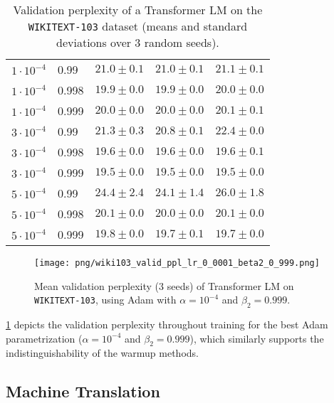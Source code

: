 {\begin{table}[ht]
\begin{tabular}{l l | c c c}
  \midrule
  
$1 \cdot {10}^{-4}$ & 0.99& $ 21.0 \pm  0.1 $& $ 21.0 \pm  0.1 $& $ 21.1 \pm  0.1 $\\
$1 \cdot {10}^{-4}$ & 0.998& $ 19.9 \pm  0.0 $& $ 19.9 \pm  0.0 $& $ 20.0 \pm  0.0 $\\
$1 \cdot {10}^{-4}$ & 0.999& $ 20.0 \pm  0.0 $& $ 20.0 \pm  0.0 $& $ 20.1 \pm  0.1 $\\
$3 \cdot {10}^{-4}$ & 0.99& $ 21.3 \pm  0.3 $& $ 20.8 \pm  0.1 $& $ 22.4 \pm  0.0 $\\
$3 \cdot {10}^{-4}$ & 0.998& $ 19.6 \pm  0.0 $& $ 19.6 \pm  0.0 $& $ 19.6 \pm  0.1 $\\
$3 \cdot {10}^{-4}$ & 0.999& $ 19.5 \pm  0.0 $& $ 19.5 \pm  0.0 $& $ 19.5 \pm  0.0 $\\
$5 \cdot {10}^{-4}$ & 0.99& $ 24.4 \pm  2.4 $& $ 24.1 \pm  1.4 $& $ 26.0 \pm  1.8 $\\
$5 \cdot {10}^{-4}$ & 0.998& $ 20.1 \pm  0.0 $& $ 20.0 \pm  0.0 $& $ 20.1 \pm  0.0 $\\
$5 \cdot {10}^{-4}$ & 0.999& $ 19.8 \pm  0.0 $& $ 19.7 \pm  0.1 $& $ 19.7 \pm  0.0 $\\  
  \bottomrule
\end{tabular}

\caption{Validation perplexity of a Transformer LM on the \texttt{WIKITEXT-103} dataset (means and standard deviations over 3 random seeds).}

\label{tbl:summary-wiki103}\end{table}

\begin{figure}[ht]
\centering

\captionsetup{
  justification=centering,
  margin=0.1in,
  size=normalsize
}

\texttt{[image: png/wiki103\_valid\_ppl\_lr\_0\_0001\_beta2\_0\_999.png]}
  
\caption{Mean validation perplexity (3 seeds) of Transformer LM on \texttt{WIKITEXT-103}, using Adam with $\alpha = 10^{-4}$ and $\beta_2 = 0.999$.}
  
\label{fig:wiki103-valid-ppl}\end{figure}

\cref*{fig:wiki103-valid-ppl} depicts the validation perplexity throughout training for the best Adam parametrization ($\alpha=10^{-4}$ and $\beta_2=0.999$), which similarly supports the indistinguishability of the warmup methods.

\subsection{Machine Translation}
\label{sec:results-wmt16-en-de}

}
